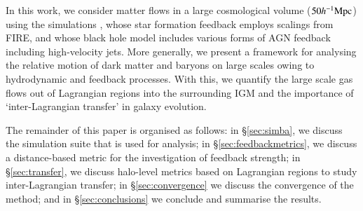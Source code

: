 In this work, we consider matter flows in a large cosmological volume ($50
h^{-1}{\rm Mpc}{}$) using the \simba{} simulations \citep{Dave2019}, whose star
formation feedback employs scalings from FIRE, and whose black hole model
includes various forms of AGN feedback including high-velocity jets. More
generally, we present a framework for analysing the relative motion of dark
matter and baryons on large scales owing to hydrodynamic and feedback
processes. With this, we quantify the large scale gas flows out of Lagrangian
regions into the surrounding IGM and the importance of `inter-Lagrangian
transfer' in galaxy evolution.

The remainder of this paper is organised as follows: in \S\ref{sec:simba}, we
discuss the \simba{} simulation suite that is used for analysis; in
\S\ref{sec:feedbackmetrics}, we discuss a distance-based metric for the
investigation of feedback strength; in \S\ref{sec:transfer}, we discuss
halo-level metrics based on Lagrangian regions to study inter-Lagrangian
transfer; in \S\ref{sec:convergence} we discuss the convergence of the
method; and in \S\ref{sec:conclusions} we conclude and summarise the results.